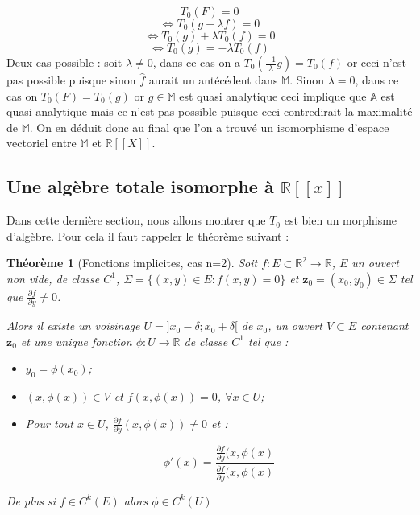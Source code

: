 \documentclass[12pt,a4paper]{amsart}
\newtheorem{thm}{\bf Th\'eor\`eme}
\begin{document}
$$T_{0}(F) = 0$$
$$ \Leftrightarrow T_{0}(g + \lambda f)= 0$$
$$\Leftrightarrow T_{0}(g ) + \lambda T_{0}(f)=0$$
$$\Leftrightarrow T_{0}(g)=-\lambda T_{0}(f)$$
Deux cas possible : soit $\lambda \neq 0$, dans ce cas on a $ T_{0}(\frac{-1}{\lambda} g)= T_{0}(f)$ or ceci n'est pas possible puisque sinon $\hat{f}$ aurait un antécédent dans $\mathbb{M}$. Sinon $\lambda =0$, dans ce cas on $T_{0}( F) = T_{0}(g) $ or $g\in \mathbb{M}$ est quasi analytique ceci implique que  $ \mathbb{A} $ est quasi analytique mais ce n'est pas possible puisque ceci contredirait la maximalité de $\mathbb{M}$. On en déduit donc au final que l'on a trouvé un isomorphisme d'espace vectoriel entre $\mathbb{M}$ et $\mathbb{R}[[X]]$. 


\subsection{Une algèbre totale isomorphe à $\mathbb R[[x]]$}
Dans cette dernière section, nous allons montrer que $T_{0}$ est bien un morphisme d'algèbre. Pour cela il faut rappeler le théorème suivant : 

\begin{thm}[Fonctions implicites, cas n=2]
Soit $ f : E \subset \mathbb{R}^{2} \rightarrow \mathbb{R}$, $E$ un ouvert non vide, de classe $C^{1}$, $\Sigma = \{(x,y)\in E : f(x,y)=0\}$ et $\textbf{z}_{0}=(x_{0},y_{0}) \in \Sigma $ tel que $\frac{\partial f}{\partial y} \neq 0$.

 Alors il existe un voisinage $U= ]x_{0}-\delta ; x_{0}+\delta[$ de $x_{0}$, un ouvert $V\subset E $ contenant  $\textbf{z}_{0}$ et une unique fonction $\phi : U \rightarrow \mathbb{R}$ de classe $C^{1}$ tel que : 

\begin{itemize}
\item $y_{0} = \phi(x_{0})$;
\item $(x, \phi(x))\in V $ et $ f(x,\phi(x))=0$, $\forall x \in U$;
\item Pour tout $x \in U $,  $\frac{\partial f}{\partial y}(x, \phi(x))\neq 0$ et : 

$$\phi'(x)=\dfrac{ \frac{\partial f}{\partial y}(x,\phi(x)}{ \frac{\partial f}{\partial y}(x,\phi(x)} $$
\end{itemize}
De plus si $f \in C^{k}(E)$ alors $\phi \in C ^{k}(U)$
\end{thm}
\end{document}
